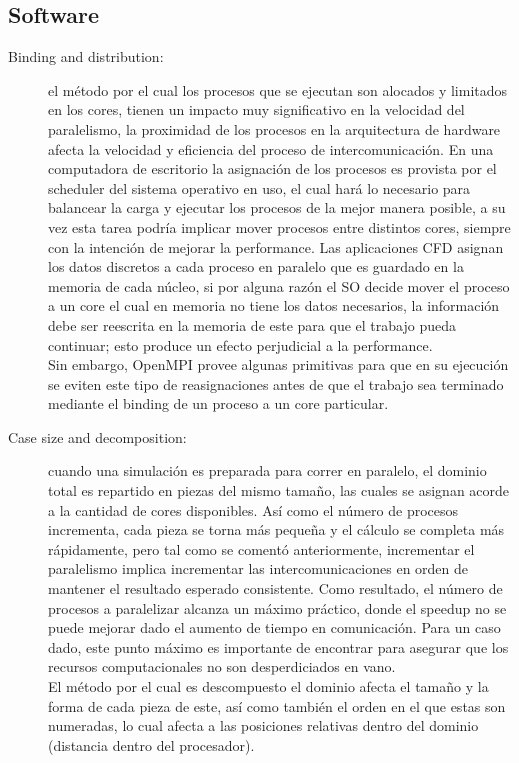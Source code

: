 \documentclass{article}
\begin{document}
\subsection{Software}
\begin{description}
    \item [Binding and distribution:] el método por el cual los procesos que se ejecutan son alocados y limitados en los cores, tienen un impacto muy significativo en la velocidad del paralelismo, la proximidad de los procesos en la arquitectura de hardware afecta la velocidad y eficiencia del proceso de intercomunicación.
        En una computadora de escritorio la asignación de los procesos es provista por el scheduler del sistema operativo en uso, el cual hará lo necesario para balancear la carga y ejecutar los procesos de la mejor manera posible, a su vez esta tarea podría implicar mover procesos entre distintos cores, siempre con la intención de mejorar la performance. Las aplicaciones CFD asignan los datos discretos a cada proceso en paralelo que es guardado en la memoria de cada núcleo, si por alguna razón el SO decide mover el proceso a un core el cual en memoria no tiene los datos necesarios, la información debe ser reescrita en la memoria de este para que el trabajo pueda continuar; esto produce un efecto perjudicial a la performance.\\
        
        Sin embargo, OpenMPI provee algunas primitivas para que en su ejecución se eviten este tipo de reasignaciones antes de que el trabajo sea terminado mediante el binding de un proceso a un core particular.
    \item [Case size and decomposition:] cuando una simulación es preparada para correr en paralelo, el dominio total es repartido en piezas del mismo tamaño, las cuales se asignan acorde a la cantidad de cores disponibles. Así como el número de procesos incrementa, cada pieza se torna más pequeña y el cálculo se completa más rápidamente, pero tal como se comentó anteriormente, incrementar el paralelismo implica incrementar las intercomunicaciones en orden de mantener el resultado esperado consistente. Como resultado, el número de procesos a paralelizar alcanza un máximo práctico, donde el speedup no se puede mejorar dado el aumento de tiempo en comunicación. Para un caso dado, este punto máximo es importante de encontrar para asegurar que los recursos computacionales no son desperdiciados en vano.\\
        
        El método por el cual es descompuesto el dominio afecta el tamaño y la forma de cada pieza de este, así como también el orden en el que estas son numeradas, lo cual  afecta a las posiciones relativas dentro del dominio (distancia dentro del procesador).\\


\end{description}
\end{document}
